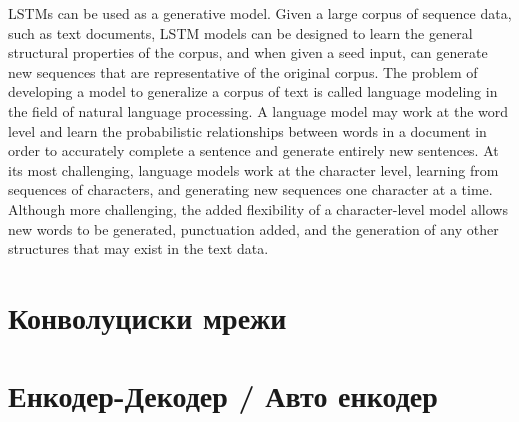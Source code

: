  
LSTMs can be used as a generative model.
Given a large corpus of sequence data, such as text documents, LSTM models can be designed to learn the general structural properties of the corpus, and when given a seed input, can generate new sequences that are representative of the original corpus.
The problem of developing a model to generalize a corpus of text is called language modeling in the field of natural language processing. A language model may work at the word level and learn the probabilistic relationships between words in a document in order to accurately complete a sentence and generate entirely new sentences. At its most challenging, language models work at the character level, learning from sequences of characters, and generating new sequences one character at a time. 
Although more challenging, the added flexibility of a character-level model allows new words to be generated, punctuation added, and the generation of any other structures that may exist in the text data.

\section{Конволуциски мрежи}

\section{Енкодер-Декодер / Авто енкодер}


